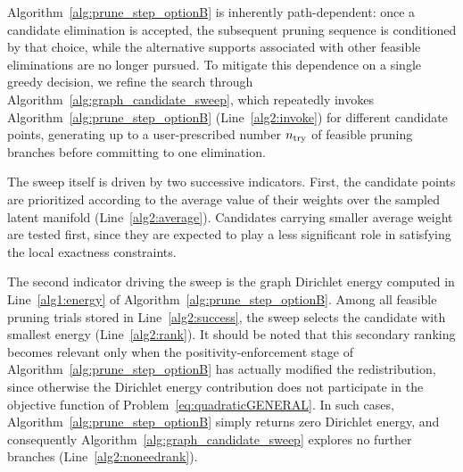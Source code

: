 \documentclass[preprint,10pt]{elsarticle}  %
\begin{document}
%

Algorithm~\ref{alg:prune_step_optionB}  is inherently
path-dependent: once a candidate elimination is accepted, the subsequent
pruning sequence is conditioned by that choice, while the alternative
supports associated with other feasible eliminations are no longer pursued.
To mitigate this dependence on a single greedy decision, we refine the
search through Algorithm~\ref{alg:graph_candidate_sweep}, which repeatedly
invokes Algorithm~\ref{alg:prune_step_optionB}
(Line~\ref{alg2:invoke}) for different candidate points, generating up to
a user-prescribed number \(n_{\mathrm{try}}\) of feasible pruning branches before
committing to one elimination.



The sweep itself is driven by two successive indicators. First, the
candidate points are prioritized according to the average value of their
weights over the sampled latent manifold (Line~\ref{alg2:average}). Candidates carrying smaller
average weight are tested first,  since they are expected to play a less significant role in
satisfying the local exactness constraints.



The second indicator driving the sweep is the graph Dirichlet energy
computed in Line~\ref{alg1:energy} of
Algorithm~\ref{alg:prune_step_optionB}. Among all feasible pruning trials
stored in Line~\ref{alg2:success}, the sweep selects the candidate with
smallest  energy (Line~\ref{alg2:rank}).  It should be noted that this secondary ranking
becomes relevant only when the positivity-enforcement stage of
Algorithm~\ref{alg:prune_step_optionB} has actually modified the
redistribution, since otherwise the Dirichlet energy contribution does not
participate in the objective function of
Problem~\eqref{eq:quadraticGENERAL}. In such cases,
Algorithm~\ref{alg:prune_step_optionB} simply returns zero Dirichlet
energy, and consequently Algorithm~\ref{alg:graph_candidate_sweep} explores no further
branches (Line~\ref{alg2:noneedrank}).
\end{document}
